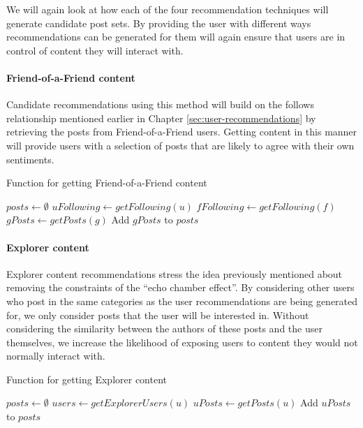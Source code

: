 We will again look at how each of the four recommendation techniques will generate candidate post sets. By providing the user with different ways recommendations can be generated for them will again ensure that users are in control of content they will interact with. 

\paragraph{Friend-of-a-Friend content} Candidate recommendations using this method will build on the follows relationship mentioned earlier in Chapter \ref{sec:user-recommendations} by retrieving the posts from Friend-of-a-Friend users. Getting content in this manner will provide users with a selection of posts that are likely to agree with their own sentiments. 

\begin{algorithm}
\caption{Function for getting Friend-of-a-Friend content}
\label{alg:fof-content}
\begin{algorithmic}[1]
	\State $posts\gets \emptyset$
	\State $uFollowing\gets getFollowing(u)$
		\State $fFollowing\gets getFollowing(f)$
			\State $gPosts\gets getPosts(g)$
			\State Add $gPosts$ to $posts$
		\EndFor  
	\EndFor
	\State {}		
\EndFunction
\end{algorithmic}
\end{algorithm}

\paragraph{Explorer content} Explorer content recommendations stress the idea previously mentioned about removing the constraints of the ``echo chamber effect''. By considering other users who post in the same categories as the user recommendations are being generated for, we only consider posts that the user will be interested in. Without considering the similarity between the authors of these posts and the user themselves, we increase the likelihood of exposing users to content they would not normally interact with.

\begin{algorithm}
\caption{Function for getting Explorer content}
\label{alg:explorer-content}
\begin{algorithmic}[1]
	\State $posts\gets \emptyset$
	\State $users\gets getExplorerUsers(u)$
		\State $uPosts\gets getPosts(u)$
		\State Add $uPosts$ to $posts$
	\EndFor
	\State {}
\EndFunction
\end{algorithmic}
\end{algorithm}

